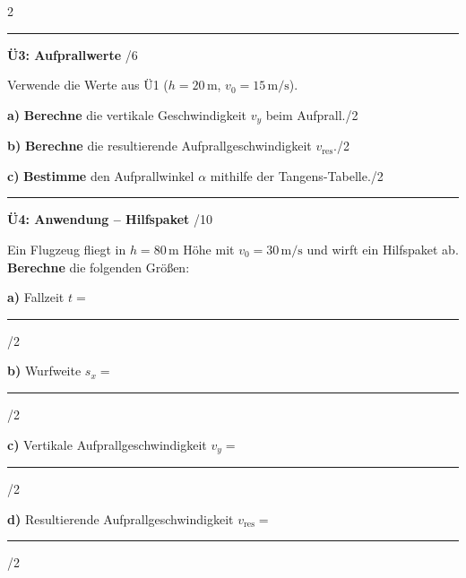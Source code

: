 \documentclass[10pt, a4paper]{article}
\newcommand{\fachfarbe}{physik}
\newcommand{\luecke}[1]{\rule{#1}{0.4pt}}
\newcommand{\punkte}[1]{\hfill\small\textcolor{grau}{/#1}}
\newcommand{\abschnitt}[1]{%
    \vspace{4pt}
    \noindent\textbf{\textcolor{\fachfarbe}{#1}}
    \vspace{2pt}
}
\begin{document}
\begin{multicols}{2}
\begin{center}
\end{center}

\hrule
\vspace{4pt}


\abschnitt{Ü3: Aufprallwerte}\punkte{6}

Verwende die Werte aus Ü1 ($h = 20\,\text{m}$, $v_0 = 15\,\text{m/s}$).

\textbf{a)} \textbf{Berechne} die vertikale Geschwindigkeit $v_y$ beim Aufprall.\hfill\textcolor{grau}{\small/2}

\vspace{1.4cm}

\textbf{b)} \textbf{Berechne} die resultierende Aufprallgeschwindigkeit $v_{\text{res}}$.\hfill\textcolor{grau}{\small/2}

\vspace{1.4cm}

\textbf{c)} \textbf{Bestimme} den Aufprallwinkel $\alpha$ mithilfe der Tangens-Tabelle.\hfill\textcolor{grau}{\small/2}

\vspace{1.2cm}

\hrule
\vspace{4pt}


\abschnitt{Ü4: Anwendung -- Hilfspaket}\punkte{10}

Ein Flugzeug fliegt in $h = 80\,\text{m}$ Höhe mit $v_0 = 30\,\text{m/s}$ und wirft ein Hilfspaket ab. \textbf{Berechne} die folgenden Größen:

\textbf{a)} Fallzeit $t = $ \luecke{2cm} \hfill\textcolor{grau}{\small/2}

\textbf{b)} Wurfweite $s_x = $ \luecke{2cm} \hfill\textcolor{grau}{\small/2}

\textbf{c)} Vertikale Aufprallgeschwindigkeit $v_y = $ \luecke{2cm} \hfill\textcolor{grau}{\small/2}

\textbf{d)} Resultierende Aufprallgeschwindigkeit $v_{\text{res}} = $ \luecke{2cm} \hfill\textcolor{grau}{\small/2}


\end{multicols}
\end{document}
